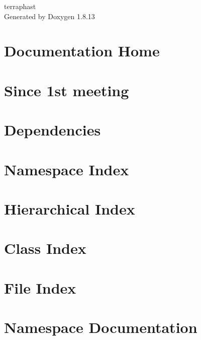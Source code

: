 \documentclass[twoside]{book}
\newcommand{\+}{\discretionary{\mbox{\scriptsize$\hookleftarrow$}}{}{}}
\newcommand{\clearemptydoublepage}{%
  \newpage{\pagestyle{empty}\cleardoublepage}%
}
\begin{document}
\hypersetup{pageanchor=false,
             bookmarksnumbered=true,
             pdfencoding=unicode
            }
\begin{titlepage}
\vspace*{7cm}
\begin{center}%
{\Large terraphast }\\
\vspace*{1cm}
{\large Generated by Doxygen 1.8.13}\\
\end{center}
\end{titlepage}
\clearemptydoublepage
{}
\tableofcontents
\clearemptydoublepage
{}
\hypersetup{pageanchor=true}

\chapter{Documentation Home}
\label{index}\hypertarget{index}{}
\chapter{Since 1st meeting}
\label{md_Changelog}

\chapter{Dependencies}
\label{md_Dependencies}

\chapter{Namespace Index}

\chapter{Hierarchical Index}

\chapter{Class Index}

\chapter{File Index}

\chapter{Namespace Documentation}











\end{document}
